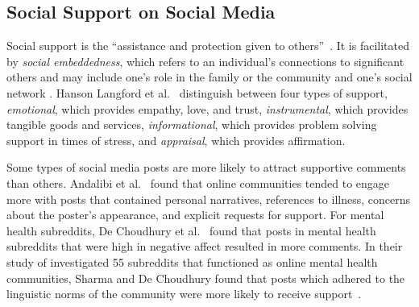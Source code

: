


\subsection{Social Support on Social Media}

Social support is the ``assistance and protection given to others''~\cite[p.95]{langford_social_1997}. It is facilitated by \emph{social embeddedness}, which refers to an individual's connections to significant others and may include one's role in the family or the community and one's social network \cite{eaton1978life}. Hanson Langford et al.~\cite{langford_social_1997} distinguish between four types of support, \emph{emotional}, which provides empathy, love, and trust, \emph{instrumental}, which provides tangible goods and services, \emph{informational}, which provides problem solving support in times of stress, and \emph{appraisal}, which provides affirmation. 

Some types of social media posts are more likely to attract supportive comments than others. Andalibi et al.~\cite{andalibi_sensitive_2017} found that online communities tended to engage more with posts that contained personal narratives, references to illness, concerns about the poster's appearance, and explicit requests for support. For mental health subreddits, De Choudhury et al.~\cite{de2014mental} found that posts in mental health subreddits that were high in negative affect resulted in more comments. In their study of investigated 55 subreddits that functioned as online mental health communities, Sharma and De Choudhury found that posts which adhered to the linguistic norms of the community were more likely to receive support~\cite{Sharma2018support}. 

